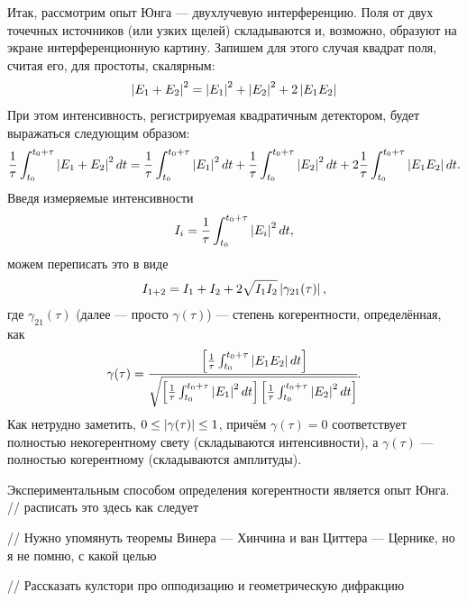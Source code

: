 Итак, рассмотрим опыт Юнга --- двухлучевую интерференцию. Поля от двух
точечных источников (или узких щелей) складываются и, возможно, образуют на
экране интерференционную картину. Запишем для этого случая квадрат поля, считая
его, для простоты, скалярным:
\begin{align*}
  \left\lvert E_1 + E_2 \right\rvert^2 = \left\lvert E_1 \right\rvert^2 + \left\lvert E_2 \right\rvert^2 + 2\left\lvert E_1E_2 \right\rvert
\end{align*}
При этом интенсивность, регистрируемая
квадратичным детектором, будет выражаться следующим образом:
\begin{align*}
  \frac{1}{\tau}\int_{t_0}^{t_0 + \tau} \left\lvert E_1 + E_2 \right\rvert^2 dt
  = \frac{1}{\tau}\int_{t_0}^{t_0 + \tau} \left\lvert E_1 \right\rvert^2dt 
  + \frac{1}{\tau}\int_{t_0}^{t_0 + \tau} \left\lvert E_2 \right\rvert^2dt 
  + 2\frac{1}{\tau}\int_{t_0}^{t_0 + \tau} \left\lvert E_1E_2 \right\rvert dt.
\end{align*}
Введя измеряемые интенсивности
\begin{align*}
  I_i = \frac{1}{\tau}\int_{t_0}^{t_0 + \tau} \left\lvert E_i \right\rvert^2 dt,
\end{align*}
можем переписать это в виде
\begin{align*}
  I_{1+2} = I_1 + I_2 + 2\sqrt{I_1I_2}\left\lvert \gamma_{21}(\tau) \right\rvert,
\end{align*}
где \(\gamma_{21}(\tau)\) (далее --- просто \(\gamma(\tau)\)) --- степень
когерентности, определённая, как
\begin{align*}
  \gamma(\tau) = \cfrac{
  \left[\frac{1}{\tau}\int_{t_0}^{t_0 + \tau} \left\lvert E_1E_2 \right\rvert dt \right]
  }{
  \sqrt{
    \left[\frac{1}{\tau}\int_{t_0}^{t_0 + \tau} \left\lvert E_1 \right\rvert^2dt\right]
    \left[\frac{1}{\tau}\int_{t_0}^{t_0 + \tau} \left\lvert E_2 \right\rvert^2dt\right] 
  }
  }.
\end{align*}
Как нетрудно заметить, \(0 \le \left\lvert \gamma(\tau) \right\rvert \le 1\), причём
\(\gamma(\tau) = 0\) соответствует полностью некогерентному свету (складываются
интенсивности), а \(\gamma(\tau)\) --- полностью когерентному (складываются
амплитуды).

Экспериментальным способом определения когерентности является опыт Юнга.
// расписать это здесь как следует

// Нужно упомянуть теоремы Винера --- Хинчина и ван Циттера --- Цернике, но я не
помню, с какой целью

// Рассказать кулстори про опподизацию и геометрическую дифракцию




